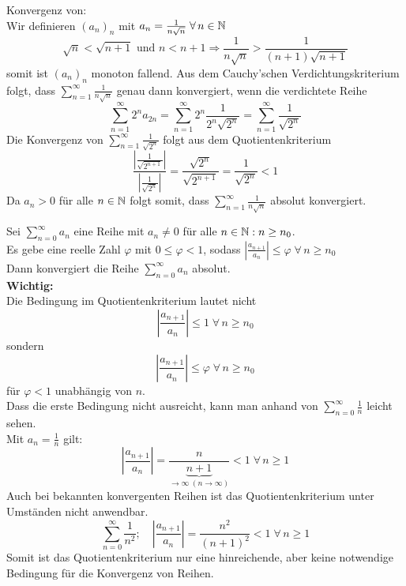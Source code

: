 \documentclass[../ana1u.tex]{subfiles}
\begin{document}
\begin{bsp}
    Konvergenz von:\\
    Wir definieren \((a_n)_n\) mit \(a_n = \frac{1}{n\sqrt{n}} \; \forall \, n \in \mathbb{N}\)\\
    \[\sqrt{n} < \sqrt{n+1} \text{ und } n < n+1 \Rightarrow \frac{1}{n\sqrt{n}} > \frac{1}{(n+1)\sqrt{n+1}}\]
    somit ist \((a_n)_n\) monoton fallend. Aus dem Cauchy'schen Verdichtungskriterium folgt, dass \(\sum_{n=1}^{\infty} \frac{1}{n\sqrt{n}}\) genau dann konvergiert, wenn die verdichtete Reihe
    \[\sum_{n=1}^{\infty} 2^n a_{2n} = \sum_{n=1}^{\infty} 2^n \frac{1}{2^n\sqrt{2^n}} = \sum_{n=1}^{\infty} \frac{1}{\sqrt{2^n}}\]
    Die Konvergenz von \(\sum_{n=1}^{\infty} \frac{1}{\sqrt{2^n}}\) folgt aus dem Quotientenkriterium
    \[\frac{\left|\frac{1}{\sqrt{2^{n+1}}}\right|}{\left|\frac{1}{\sqrt{2^n}}\right|} = \frac{\sqrt{2^n}}{\sqrt{2^{n+1}}} = \frac{1}{\sqrt{2^n}} < 1\]
    Da \(a_n > 0\) für alle \(n \in \mathbb{N}\) folgt somit, dass \(\sum_{n=1}^{\infty} \frac{1}{n\sqrt{n}}\) absolut konvergiert.
\end{bsp}
\begin{satz}[Quotientenkriterium]
    Sei \(\sum_{n=0}^{\infty} a_n\) eine Reihe mit \(a_n \neq 0\) für alle \(n \in \mathbb{N}: n \geq n_0\).\\
    Es gebe eine reelle Zahl \(\varphi\) mit \(0 \leq \varphi < 1\), sodass \(\left|\frac{a_{n+1}}{a_n}\right| \leq \varphi \; \forall \, n \geq n_0\)\\
    Dann konvergiert die Reihe \(\sum_{n=0}^{\infty} a_n\) absolut.\\
    \textbf{Wichtig:}\\
    Die Bedingung im Quotientenkriterium lautet nicht 
    \[\left|\frac{a_{n+1}}{a_n}\right| \leq 1 \; \forall \, n \geq n_0\]
    sondern
    \[\left|\frac{a_{n+1}}{a_n}\right| \leq \varphi \; \forall \, n \geq n_0\]
    für \(\varphi < 1\) unabhängig von \(n\).\\
    Dass die erste Bedingung nicht ausreicht, kann man anhand von \(\sum_{n=0}^{\infty} \frac{1}{n}\) leicht sehen.\\
    Mit \(a_n = \frac{1}{n}\) gilt: 
    \[\left|\frac{a_{n+1}}{a_n}\right| = \frac{n}{\underbrace{n+1}_{\rightarrow \infty \; (n \rightarrow \infty)}} < 1 \; \forall \, n \geq 1\]
    Auch bei bekannten konvergenten Reihen ist das Quotientenkriterium unter Umständen nicht anwendbar.
    \[\sum_{n=0}^{\infty} \frac{1}{n^2}; \quad \left|\frac{a_{n+1}}{a_n}\right| = \frac{n^2}{(n+1)^2} < 1 \; \forall \, n \geq 1\]
    Somit ist das Quotientenkriterium nur eine hinreichende, aber keine notwendige Bedingung für die Konvergenz von Reihen.
\end{satz}
\end{document}
